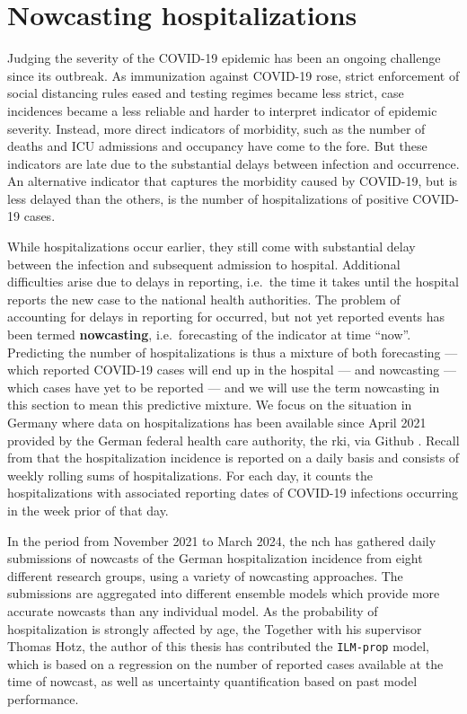 \section{Nowcasting hospitalizations}%
\newcommand*{\ssm}{\texttt{ssm}\xspace}
\newcommand*{\ilmpropbig}{\texttt{ILM-prop}\xspace}
\newcommand*{\ilmpropsmall}{\texttt{ILM-prop42}\xspace}
\newcommand*{\ensemble}{\texttt{ensemble}\xspace}
\label{sec:nowcasting_hospitalizations}
Judging the severity of the COVID-19 epidemic has been an ongoing challenge since its outbreak. As immunization against COVID-19 rose, strict enforcement of social distancing rules eased and testing regimes became less strict, case incidences became a less reliable and harder to interpret indicator of epidemic severity. Instead, more direct indicators of morbidity, such as the number of deaths and ICU admissions and occupancy have come to the fore. But these indicators are late due to the substantial delays between infection and occurrence. An alternative indicator that captures the morbidity caused by COVID-19, but is less delayed than the others, is the number of hospitalizations of positive COVID-19 cases.

While hospitalizations occur earlier, they still come with substantial delay between the infection and subsequent admission to hospital. Additional difficulties arise due to delays in reporting, i.e.~the time it takes until the hospital reports the new case to the national health authorities. The problem of accounting for delays in reporting for occurred, but not yet reported events has been termed \textbf{nowcasting}, i.e.~forecasting of the indicator at time ``now''. Predicting the number of hospitalizations is thus a mixture of both forecasting --- which reported COVID-19 cases will end up in the hospital --- and nowcasting --- which cases have yet to be reported --- and we will use the term nowcasting in this section to mean this predictive mixture. We focus on the situation in Germany where data on hospitalizations has been available since April 2021 provided by the German federal health care authority, the \gls{rki}, via Github \citep{RobertKoch-Institut2021COVID19Hospitalisierungen}. Recall from  that the hospitalization incidence is reported on a daily basis and consists of weekly rolling sums of hospitalizations. For each day, it counts the hospitalizations with associated reporting dates of COVID-19 infections occurring in the week prior of that day. 

In the period from November 2021 to March 2024, the \gls{nch} \citep{Wolffram2023Collaborative} has gathered daily submissions of nowcasts of the German hospitalization incidence from eight different research groups, using a variety of nowcasting approaches. The submissions are aggregated into different ensemble models which provide more accurate nowcasts than any individual model. 
As the probability of hospitalization is strongly affected by age, the 
Together with his supervisor Thomas Hotz, the author of this thesis has contributed the \ilmpropbig model, which is based on a regression on the number of reported cases available at the time of nowcast, as well as uncertainty quantification based on past model performance. 


